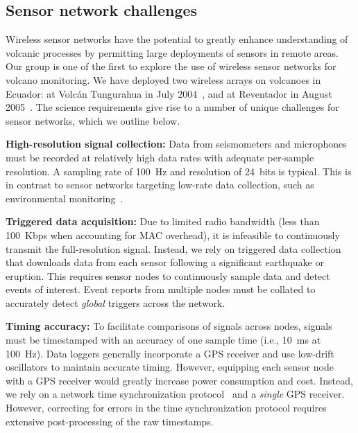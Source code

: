 \subsection{Sensor network challenges}

Wireless sensor networks have the potential to greatly enhance
understanding of volcanic processes by permitting large deployments 
of sensors in remote areas.
Our group is one of the first to explore the use of wireless
sensor networks for volcano monitoring. We have deployed
two wireless arrays on volcanoes in Ecuador: at Volc\'{a}n Tungurahua 
in July 2004~\cite{volcano-ewsn05}, and at 
Reventador in August 2005~\cite{volcano-ieeeic06}. 
The science requirements give rise to a 
number of unique challenges for sensor networks, which we 
outline below.

{\bf High-resolution signal collection:}
Data from seismometers and microphones must be recorded at 
relatively high data rates with adequate per-sample resolution. 
A sampling rate of 100~Hz and resolution of 24~bits is typical.
This is in contrast
to sensor networks targeting low-rate data collection,
such as environmental monitoring~\cite{gdi-sensys04,berkeley-redwoods}.

{\bf Triggered data acquisition:}
Due to limited radio bandwidth (less than 100~Kbps when accounting 
for MAC overhead), it is infeasible 
to continuously transmit the full-resolution signal.
Instead, we rely on triggered data collection that
downloads data from each sensor following
a significant earthquake or eruption. This requires sensor nodes
to continuously sample data and detect events of interest. 
Event reports from multiple nodes must be collated to accurately 
detect {\em global} triggers across the network.

{\bf Timing accuracy:} 
To facilitate comparisons of signals across nodes, signals
must be timestamped with an accuracy of one sample time 
(i.e., 10~ms at 100~Hz). 
Data loggers generally incorporate a GPS receiver and use low-drift 
oscillators to maintain accurate timing. However, equipping each
sensor node with a GPS receiver would greatly increase power
consumption and cost. Instead, we rely on a network time 
synchronization protocol~\cite{rbs,ftsp} and a {\em single} GPS
receiver. However, correcting for errors in the time 
synchronization protocol requires extensive post-processing 
of the raw timestamps.


